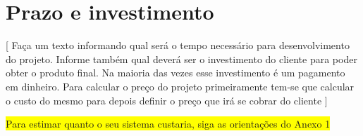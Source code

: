 \section{Prazo e investimento}

{\color{red} [ 
    Faça um texto informando qual será o tempo necessário para desenvolvimento do projeto. Informe também qual deverá ser o investimento do cliente para poder obter o produto final. Na maioria das vezes esse investimento é um pagamento em dinheiro. Para calcular o preço do projeto primeiramente tem-se que calcular o custo do mesmo para depois definir o preço que irá se cobrar do cliente
]}

\noindent\colorbox{yellow}{Para estimar quanto o seu sistema custaria, siga as orientações do Anexo 1}